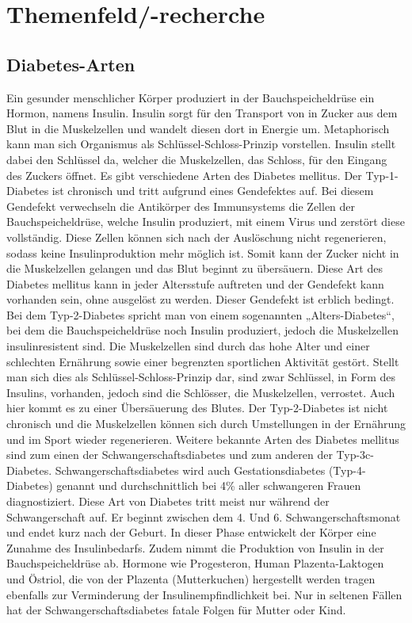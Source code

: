 \documentclass[a4paper,11pt]{article}%
\renewcommand{\\}{\vspace*{0.5\baselineskip} \newline}
\begin{document}
	
	
	\section{Themenfeld/-recherche}
	\label{section:Themenfeld}
	\subsection{Diabetes-Arten}
	Ein gesunder menschlicher Körper produziert in der Bauchspeicheldrüse ein Hormon, namens Insulin. Insulin sorgt für den Transport von in Zucker aus dem Blut in die Muskelzellen und wandelt diesen dort in Energie um. Metaphorisch kann man sich Organismus als Schlüssel-Schloss-Prinzip vorstellen. Insulin stellt dabei den Schlüssel da, welcher die Muskelzellen, das Schloss, für den Eingang des Zuckers öffnet. Es gibt verschiedene Arten des Diabetes mellitus. \\	
	Der Typ-1-Diabetes ist chronisch und tritt aufgrund eines Gendefektes auf. Bei diesem Gendefekt verwechseln die Antikörper des Immunsystems die Zellen der Bauchspeicheldrüse, welche Insulin produziert, mit einem Virus und zerstört diese vollständig. Diese Zellen können sich nach der Auslöschung nicht regenerieren, sodass keine Insulinproduktion mehr möglich ist. Somit kann der Zucker nicht in die Muskelzellen gelangen und das Blut beginnt zu übersäuern. Diese Art des Diabetes mellitus kann in jeder Altersstufe auftreten und der Gendefekt kann vorhanden sein, ohne ausgelöst zu werden. Dieser Gendefekt ist erblich bedingt.\\
	Bei dem Typ-2-Diabetes spricht man von einem sogenannten „Alters-Diabetes“, bei dem die Bauchspeicheldrüse noch Insulin produziert, jedoch die Muskelzellen insulinresistent sind. Die Muskelzellen sind durch das hohe Alter und einer schlechten Ernährung sowie einer begrenzten sportlichen Aktivität gestört. Stellt man sich dies als Schlüssel-Schloss-Prinzip dar, sind zwar Schlüssel, in Form des Insulins, vorhanden, jedoch sind die Schlösser, die Muskelzellen, verrostet. Auch hier kommt es zu einer Übersäuerung des Blutes. Der Typ-2-Diabetes ist nicht chronisch und die Muskelzellen können sich durch Umstellungen in der Ernährung und im Sport wieder regenerieren.\\
	Weitere bekannte Arten des Diabetes mellitus sind zum einen der Schwangerschaftsdiabetes und zum anderen der Typ-3c-Diabetes.\newline
	Schwangerschaftsdiabetes wird auch Gestationsdiabetes (Typ-4-Diabetes) genannt und durchschnittlich bei 4\% aller schwangeren Frauen diagnostiziert. Diese Art von Diabetes tritt meist nur während der Schwangerschaft auf. Er beginnt zwischen dem 4. Und 6. Schwangerschaftsmonat und endet kurz nach der Geburt. In dieser Phase entwickelt der Körper eine Zunahme des Insulinbedarfs. Zudem nimmt die Produktion von Insulin in der Bauchspeicheldrüse ab. Hormone wie Progesteron, Human Plazenta-Laktogen und Östriol, die von der Plazenta (Mutterkuchen) hergestellt werden tragen ebenfalls zur Verminderung der Insulinempfindlichkeit bei. Nur in seltenen Fällen hat der Schwangerschaftsdiabetes fatale Folgen für Mutter oder Kind.\\
\end{document}
